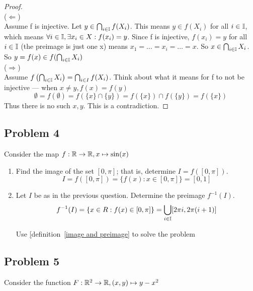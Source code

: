 \documentclass[11pt]{article}
\begin{document}
\begin{enumerate}
    \begin{proof}
      $ $\\
      ($\Leftarrow$) \\
      Assume f is injective. Let $y \in \bigcap_{i\in \mathbb{I}} f(X_i)$. This means $y \in f(X_i)$ for all $i \in \mathbb{I}$, which means $\forall i \in\mathbb{I}, \exists x_i \in X: f(x_i) = y$. Since f is injective, $f(x_i) = y$ for all $i \in\mathbb{I}$ (the preimage is just one x) means $x_1 = \dots = x_i = \dots = x$. So $x\in\bigcap_{i\in\mathbb{I}}X_i$. So $y=f(x)\in f(\bigcap_{i \in\mathbb{I}} X_i)$ \\
      ($\Rightarrow$) \\
      Assume $f\left(\bigcap_{i\in \mathbb{I}} X_{i}\right) = \bigcap_{i\in I} f(X_{i})$. Think about what it means for f to not be injective --- when $x\neq y, f(x) = f(y)$
      \[
        \emptyset = f(\emptyset) = f(\{x\}\cap\{y\}) = f(\{x\})\cap f(\{y\}) = f(\{x\})
      \]
      Thus there is no such $x,y$. This is a contradiction.
    \end{proof}

\end{enumerate}

\subsection*{Problem 4}
Consider the map $f: \mathbb{R} \to \mathbb{R}, x \mapsto \sin(x)$

\begin{enumerate}
  \item Find the image of the set $[0,\pi]$; that is, determine $I = f([0,\pi])$. \\
  \[
    I = f([0,\pi]) = \{f(x): x \in [0, \pi]\} = [0, 1]
  \]
  \item Let $I$ be as in the previous question. Determine the preimage $f^{-1}(I)$. \\
  \[
    f^{-1}(I) = \{ x \in R: f(x) \in [0, \pi]\} = \bigcup_{i\in\mathbb{I}} [2\pi i, 2\pi(i+1)]
  \]
  \begin{rem}
    Use \hyperref[image and preimage][definition~\eqref{image and preimage} to solve the problem
  \end{rem}
\end{enumerate}


\subsection*{Problem 5}
Consider the function $F: \mathbb{R}^2 \to \mathbb{R}, (x,y) \mapsto y - x^2$
\end{document}
